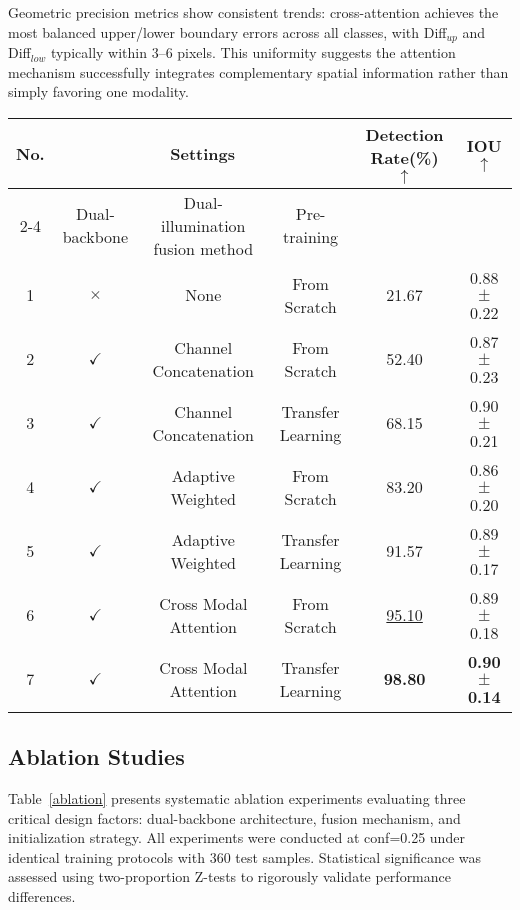 \documentclass[journal,twoside,web]{ieeecolor}
\begin{document}
Geometric precision metrics show consistent trends: cross-attention achieves the most balanced upper/lower boundary errors across all classes, with Diff$_{up}$ and Diff$_{low}$ typically within 3--6 pixels. This uniformity suggests the attention mechanism successfully integrates complementary spatial information rather than simply favoring one modality.

\begin{table*}[!t]
\caption{Ablation Experiments on the Blood Fractionation Component Segmentation Task at conf=0.25}
\label{ablation}
\centering
\setlength{\tabcolsep}{12pt}
\renewcommand{\arraystretch}{1.8}
\begin{tabular}{c c c c c c}
\hline
\multirow{2}{*}{\textbf{No.}} &
\multicolumn{3}{c}{\textbf{Settings}} &
\multirow{2}{*}{\textbf{Detection Rate(\%) $\uparrow$}} &
\multirow{2}{*}{\textbf{IOU $\uparrow$}} \\
\cline{2-4}
 & Dual-backbone & Dual-illumination fusion method & Pre-training & \\
\hline
1 & $\times$     & None                     & From Scratch      & 21.67 & 0.88$\pm$0.22 \\
2 & $\checkmark$ & Channel Concatenation    & From Scratch      & 52.40 & 0.87$\pm$0.23 \\
3 & $\checkmark$ & Channel Concatenation    & Transfer Learning & 68.15 & \underline{}{0.90$\pm$0.21} \\
4 & $\checkmark$ & Adaptive Weighted        & From Scratch      & 83.20 & 0.86$\pm$0.20 \\
5 & $\checkmark$ & Adaptive Weighted        & Transfer Learning & 91.57 & 0.89$\pm$0.17 \\
6 & $\checkmark$ & Cross Modal Attention    & From Scratch      & \underline{95.10} & 0.89$\pm$0.18 \\
7 & $\checkmark$ & Cross Modal Attention    & Transfer Learning & \textbf{98.80} & \textbf{0.90$\pm$0.14} \\
\hline
\end{tabular}
\end{table*}

\subsection{Ablation Studies}

Table~\ref{ablation} presents systematic ablation experiments evaluating three critical design factors: dual-backbone architecture, fusion mechanism, and initialization strategy. All experiments were conducted at conf=0.25 under identical training protocols with 360 test samples. Statistical significance was assessed using two-proportion Z-tests to rigorously validate performance differences.
\end{document}
